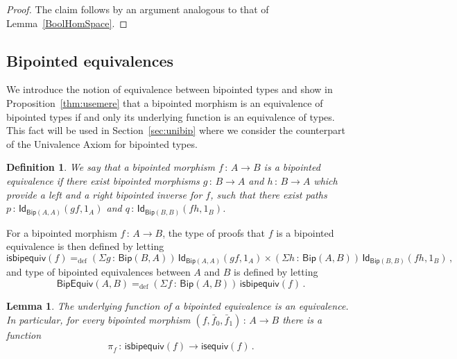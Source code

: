 \documentclass[10pt,a4paper,oneside,reqno]{amsart}
\numberwithin{equation}{section}
\theoremstyle{mythm}
\newtheorem{lemma}[theorem]{Lemma}
\theoremstyle{mydef}
\newtheorem{definition}[theorem]{Definition}
\theoremstyle{myrmk}
\newcommand{\ie}{\text{i.e.\ }}
\newcommand{\myemph}[1]{\textit{#1}}
\newcommand{\defeq}{=_{\mathrm{def}}}
\newcommand{\co}{\,{:}\,}
\newcommand{\isequiv}{\mathsf{isequiv}}
\newcommand{\Id}{\mathsf{Id}}
\newcommand{\Bip}{\mathsf{Bip}}
\newcommand{\BipHom}{\mathsf{Bip}}
\newcommand{\isbipequiv}{\mathsf{isbipequiv}}
\newcommand{\BipEquiv}{\mathsf{BipEquiv}}
\begin{document}
\begin{proof} The claim follows by an argument analogous to that of Lemma~\ref{BoolHomSpace}.
\end{proof}




\subsection{Bipointed equivalences} We introduce the notion of equivalence between bipointed types and show
in Proposition~\ref{thm:usemere}  that a bipointed morphism is an equivalence of bipointed types if and only its underlying function is an equivalence of types. This fact will be used in Section~\ref{sec:unibip} where we consider the counterpart of the Univalence Axiom for bipointed types. 



\begin{definition} We say that a bipointed morphism $f \co A \to B$ is a \myemph{bipointed equivalence}
if there exist bipointed morphisms $g \co B \to A$ and $h \co B \to A$ which provide a left and a right bipointed inverse for $f$, \ie such that there exist paths $p \co \Id_{\Bip(A,A)}(g  f, 1_A)$ 
and $q \co \Id_{\Bip(B,B)} ( f  h, 1_B)$.
\end{definition}

For a bipointed morphism $f \co A \to B$, the type of proofs that $f$ is a bipointed equivalence is
then defined by letting
\[
\isbipequiv(f) \defeq   (\Sigma g \co \BipHom(B,A)) \,  \Id_{\Bip(A,A)}( g  f, 1_A ) \times 
    (\Sigma h \co \BipHom(A, B)) \, \Id_{\Bip(B,B)} (f  h , 1_B ) \, ,
\]
and type of bipointed equivalences between $A$ and $B$ is defined by letting
\[
\BipEquiv(A, B)
\defeq    
(\Sigma f \co \BipHom(A,B)) \, \isbipequiv(f)  \, . 
\] 


\begin{lemma} The underlying function of a bipointed equivalence is an equivalence. In particular,
for every bipointed morphism $(f, \bar{f}_0, \bar{f}_1) \co A \to B$  there is a  function 
\[
\pi_f \co \isbipequiv(f) \to \isequiv(f) \, .
\]
\end{lemma} 
\end{document}
